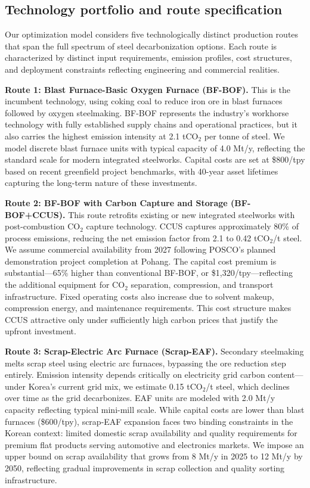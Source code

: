 \subsection{Technology portfolio and route specification}

Our optimization model considers five technologically distinct production routes that span the full spectrum of steel decarbonization options. Each route is characterized by distinct input requirements, emission profiles, cost structures, and deployment constraints reflecting engineering and commercial realities.

\textbf{Route 1: Blast Furnace-Basic Oxygen Furnace (BF-BOF).} This is the incumbent technology, using coking coal to reduce iron ore in blast furnaces followed by oxygen steelmaking. BF-BOF represents the industry's workhorse technology with fully established supply chains and operational practices, but it also carries the highest emission intensity at 2.1 tCO$_2$ per tonne of steel. We model discrete blast furnace units with typical capacity of 4.0 Mt/y, reflecting the standard scale for modern integrated steelworks. Capital costs are set at \$800/tpy based on recent greenfield project benchmarks, with 40-year asset lifetimes capturing the long-term nature of these investments.

\textbf{Route 2: BF-BOF with Carbon Capture and Storage (BF-BOF+CCUS).} This route retrofits existing or new integrated steelworks with post-combustion CO$_2$ capture technology. CCUS captures approximately 80\% of process emissions, reducing the net emission factor from 2.1 to 0.42 tCO$_2$/t steel. We assume commercial availability from 2027 following POSCO's planned demonstration project completion at Pohang. The capital cost premium is substantial—65\% higher than conventional BF-BOF, or \$1,320/tpy—reflecting the additional equipment for CO$_2$ separation, compression, and transport infrastructure. Fixed operating costs also increase due to solvent makeup, compression energy, and maintenance requirements. This cost structure makes CCUS attractive only under sufficiently high carbon prices that justify the upfront investment.

\textbf{Route 3: Scrap-Electric Arc Furnace (Scrap-EAF).} Secondary steelmaking melts scrap steel using electric arc furnaces, bypassing the ore reduction step entirely. Emission intensity depends critically on electricity grid carbon content—under Korea's current grid mix, we estimate 0.15 tCO$_2$/t steel, which declines over time as the grid decarbonizes. EAF units are modeled with 2.0 Mt/y capacity reflecting typical mini-mill scale. While capital costs are lower than blast furnaces (\$600/tpy), scrap-EAF expansion faces two binding constraints in the Korean context: limited domestic scrap availability and quality requirements for premium flat products serving automotive and electronics markets. We impose an upper bound on scrap availability that grows from 8 Mt/y in 2025 to 12 Mt/y by 2050, reflecting gradual improvements in scrap collection and quality sorting infrastructure.

